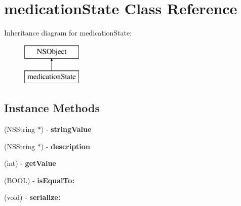 \hypertarget{interfacemedication_state}{}\section{medication\+State Class Reference}
\label{interfacemedication_state}
Inheritance diagram for medication\+State\+:\begin{figure}[H]
\begin{center}
\leavevmode
\includegraphics[height=2.000000cm]{interfacemedication_state}
\end{center}
\end{figure}
\subsection*{Instance Methods}
\begin{DoxyCompactItemize}
\item 
\hypertarget{interfacemedication_state_a0c59a35ca187bd435f3e63baf08a004d}{}(N\+S\+String $\ast$) -\/ {\bfseries string\+Value}\label{interfacemedication_state_a0c59a35ca187bd435f3e63baf08a004d}

\item 
\hypertarget{interfacemedication_state_ab0563691d3b0bbdf5accd8c9b62f75bf}{}(N\+S\+String $\ast$) -\/ {\bfseries description}\label{interfacemedication_state_ab0563691d3b0bbdf5accd8c9b62f75bf}

\item 
\hypertarget{interfacemedication_state_a3ddb55012d6f7c9f1487dc0fe9fc2dba}{}(int) -\/ {\bfseries get\+Value}\label{interfacemedication_state_a3ddb55012d6f7c9f1487dc0fe9fc2dba}

\item 
\hypertarget{interfacemedication_state_a5c2db5261c9061dd9ef8297b984f9fea}{}(B\+O\+O\+L) -\/ {\bfseries is\+Equal\+To\+:}\label{interfacemedication_state_a5c2db5261c9061dd9ef8297b984f9fea}

\item 
\hypertarget{interfacemedication_state_ae9ebf0aec4144aba0b111b6ed26c667d}{}(void) -\/ {\bfseries serialize\+:}\label{interfacemedication_state_ae9ebf0aec4144aba0b111b6ed26c667d}

\end{DoxyCompactItemize}
